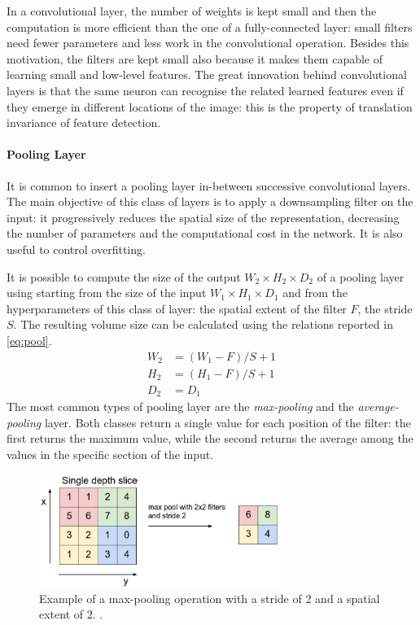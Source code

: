 In a convolutional layer, the number of weights is kept small and then the computation is more efficient than the one of a fully-connected layer: small filters need fewer parameters and less work in the convolutional operation. Besides this motivation, the filters are kept small also because it makes them capable of learning small and low-level features. The great innovation behind convolutional layers is that the same neuron can recognise the related learned features even if they emerge in different locations of the image: this is the property of translation invariance of feature detection.

\paragraph{Pooling Layer}

It is common to insert a pooling layer in-between successive convolutional layers. The main objective of this class of layers is to apply a downsampling filter on the input: it progressively reduces the spatial size of the representation, decreasing the number of parameters and the computational cost in the network. It is also useful to control overfitting.

It is possible to compute the size of the output $W_2 \times H_2 \times D_2$ of a pooling layer using starting from the size of the input $W_1 \times H_1 \times D_1$ and from the hyperparameters of this class of layer: the spatial extent of the filter $F$, the stride $S$. The resulting volume size can be calculated using the relations reported in \vref{eq:pool}.
\begin{equation} \label{eq:pool}
	\begin{aligned}
		W_2 & = (W_1 - F)/S + 1  \\
		H_2 & = (H_1 - F )/S + 1 \\
		D_2 & = D_1
	\end{aligned}
\end{equation}
The most common types of pooling layer are the \textit{max-pooling} and the \textit{average-pooling} layer. Both classes return a single value for each position of the filter: the first returns the maximum value, while the second returns the average among the values in the specific section of the input.



\begin{figure}[!h]
	\centering
	\includegraphics[width=0.7\textwidth]{img/maxpool.jpeg}
	\caption[Max-Pooling layer example]{Example of a max-pooling operation with a stride of 2 and a spatial extent of 2. \cite{stanford2019cs231n}.}
	\label{fig:avgpool}
\end{figure}

